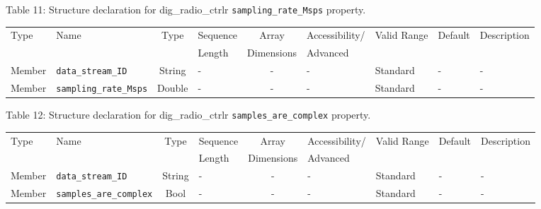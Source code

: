 \documentclass{article}
\def\comp{dig\_radio\_ctrlr}
\begin{document}
\begin{landscape}
	\noindent Table \hypertarget{tab11}{11}: Structure declaration for \comp{} \verb+sampling_rate_Msps+ property.
	\begin{scriptsize}
		\noindent\begin{longtable}{|p{1.8cm}|p{3.6cm}|c|p{4cm}|c|p{2cm}|p{1.7cm}|p{0.8cm}|p{4.69cm}|}
			\hline
			\rowcolor{blue}
			Type         & Name                                & Type & Sequence & Array      & Accessibility/ & Valid Range  & Default & Description                                                                                                                                                                                                                       \\
			\rowcolor{blue}
			             &                                     &      & Length   & Dimensions & Advanced       &              &         &                                                                                                                                                                                                                             \\
			\hline
			Member       & \verb+data_stream_ID+               & String& -       & -          & -              & Standard     & -       & - \\
			\hline
			Member       & \verb+sampling_rate_Msps+            & Double & -       & -          & -              & Standard & -       & - \\
			\hline
		\end{longtable}
	\end{scriptsize}

	\noindent Table \hypertarget{tab12}{12}: Structure declaration for \comp{} \verb+samples_are_complex+ property.
	\begin{scriptsize}
		\noindent\begin{longtable}{|p{1.8cm}|p{3.6cm}|c|p{4cm}|c|p{2cm}|p{1.7cm}|p{0.8cm}|p{4.81cm}|}
			\hline
			\rowcolor{blue}
			Type         & Name                                & Type & Sequence & Array      & Accessibility/ & Valid Range  & Default & Description                                                                                                                                                                                                                       \\
			\rowcolor{blue}
			             &                                     &      & Length   & Dimensions & Advanced       &              &         &                                                                                                                                                                                                                             \\
			\hline
			Member       & \verb+data_stream_ID+               & String& -       & -          & -              & Standard     & -       & - \\
			\hline
			Member       & \verb+samples_are_complex+           & Bool   & -       & -          & -              & Standard & -       & - \\
			\hline
		\end{longtable}
	\end{scriptsize}


\end{landscape}
\end{document}
